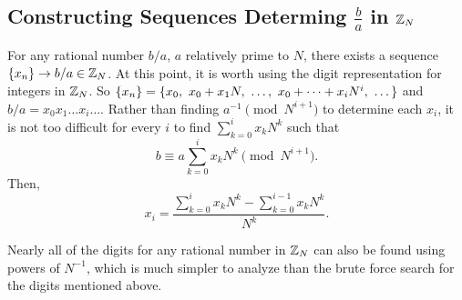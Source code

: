 \subsection{Constructing Sequences Determing $\frac{b}{a}$ in $\mathbb{Z}_N$}

\par For any rational number $b/a$, $a$ relatively prime to $N$, there
exists a sequence $\{x_n\} \rightarrow b/a \in \mathbb{Z}_N$. At this point, it is worth
using the digit representation for integers in $\mathbb{Z}_N$. So
$\xn=\{x_0, \ x_0+x_1N, \ \dots, \ x_0+\dots+x_iN^i, \ \dots\}$
and $b/a = x_0x_1\dots x_i\dots$. Rather than finding $a^{-1}\pmod N^{i+1}$ to
determine each $x_i$, it is not too difficult for every $i$ to find $\sum_{k=0}^ix_kN^k$
such that
\begin{equation}\label{eq:seq-rational}
  b \equiv a\sum_{k=0}^ix_kN^k \pmod{N^{i+1}}.
\end{equation}
Then, 
\begin{equation}
  x_i = \frac{\sum_{k=0}^ix_kN^k - \sum_{k=0}^{i-1}x_kN^k}{N^k}.
\end{equation}

\par Nearly all of the digits for any rational number in $\mathbb{Z}_N$ can also
be found using powers of $N^{-1}$, which is much simpler to analyze
than the brute force search for the digits mentioned above.


